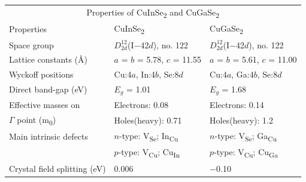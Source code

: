 \documentclass[a4paper, 12pt, titlepage,oneside,drop]{kthesis}
\begin{document}
\vspace{0cm}

\begin {table}[!htb]
\centering
\begin{tabular}{l l l}  
\toprule
\toprule
\multicolumn{3}{c}{\large Properties of CuInSe\textsubscript{2} and CuGaSe\textsubscript{2}}  \\  
\cellcolor{blue!25} Properties & \cellcolor{blue!25} CuInSe\textsubscript{2} & \cellcolor{blue!25} CuGaSe\textsubscript{2} \\ 

Space group & $D_{2d}^{12}$(I$-$42$d$), no. 122 \cite{madelung2004semiconductors} & $D_{2d}^{12}$(I$-$42$d$), no. 122 \cite{madelung2004semiconductors}\\ 
\rowcolor[gray]{0.9}
Lattice constants (Å) & $a$ = $b$ = 5.78, $c$ = 11.55 \cite{madelung2004semiconductors} & $a$ = $b$ = 5.61, $c$ = 11.00 \cite{madelung2004semiconductors}\\ 
Wyckoff positions & Cu:4$a$, In:4$b$, Se:8$d$ \cite{parlak2006ab, hones2008polarization,persson2008anisotropic}& Cu:4$a$, Ga:4$b$, Se:8$d$ \cite{parlak2006ab, hones2008polarization,persson2008anisotropic}\\ 
\rowcolor[gray]{0.9}
Direct band-gap (eV) & $E_g$ = 1.01 \cite{madelung2004semiconductors} & $E_g$ = 1.68 \cite{madelung2004semiconductors}\\ 
Effective masses on  & Electrons: 0.08 \cite{rau2006wide}& Electrons: 0.14 \cite{rau2006wide} \\ 
 $\Gamma$ point (m\textsubscript{0})                                     & Holes(heavy): 0.71 \cite{rau2006wide}& Holes(heavy): 1.2 \cite{rau2006wide} \\ 
\rowcolor[gray]{0.9}
Main intrinsic defects & $n$-type: V\textsubscript{Se}; In\textsubscript{Cu} \cite{chen2010intrinsic, schuler2004self, lany2008intrinsic, zhang1998defect}&  $n$-type: V\textsubscript{Se}; Ga\textsubscript{Cu} \cite{chen2010intrinsic, schuler2004self, lany2008intrinsic, zhang1998defect}\\
\rowcolor[gray]{0.9}   & $p$-type: V\textsubscript{Cu}; Cu\textsubscript{In} \cite{chen2010intrinsic, schuler2004self, lany2008intrinsic, zhang1998defect}&  $p$-type: V\textsubscript{Cu}; Cu\textsubscript{Ga} \cite{chen2010intrinsic, schuler2004self, lany2008intrinsic, zhang1998defect} \\  
Crystal field splitting (eV)& 0.006 \cite{madelung2004semiconductors} & $-$0.10 \cite{madelung2010springer}\\ 

\end{tabular}
\end{table}
\end{document}
